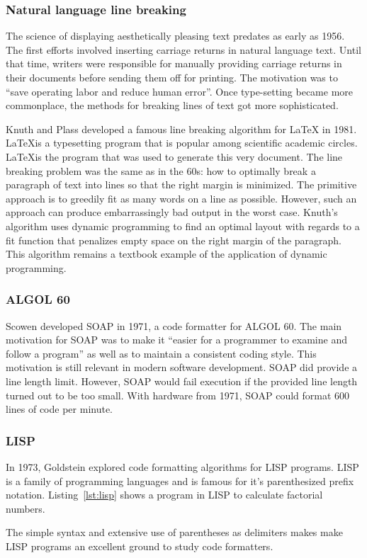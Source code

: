 \subsubsection{Natural language line breaking}
The science of displaying aesthetically pleasing text predates as early as 1956\autocite{harris_keyboard_1956}.
The first efforts involved inserting carriage returns in natural language text.
Until that time, writers were responsible for manually providing carriage returns in their documents before sending them off for printing.
The motivation was to ``save operating labor and reduce human error''.
Once type-setting became more commonplace, the methods for breaking lines of text got more sophisticated.

Knuth and Plass developed a famous line breaking algorithm\autocite{knuth_breaking_1981} for \LaTeX{} in 1981.
\LaTeX is a typesetting program that is popular among scientific academic circles.
\LaTeX is the program that was used to generate this very document.
The line breaking problem was the same as in the 60s: how to optimally break a paragraph of text into lines so that the right margin is minimized.
The primitive approach is to greedily fit as many words on a line as possible.
However, such an approach can produce embarrassingly bad output in the worst case.
Knuth's algorithm uses dynamic programming to find an optimal layout with regards to a fit function that penalizes empty space on the right margin of the paragraph.
This algorithm remains a textbook example of the application of dynamic programming\autocite{dreyfus2002richard}.

\subsubsection{ALGOL 60}
Scowen\autocite{scowen_soapprogram_1971} developed SOAP in 1971, a code formatter for ALGOL 60.
The main motivation for SOAP was to make it ``easier for a programmer to examine and follow a program'' as well as to maintain a consistent coding style.
This motivation is still relevant in modern software development.
SOAP did provide a line length limit.
However, SOAP would fail execution if the provided line length turned out to be too small.
With hardware from 1971, SOAP could format 600 lines of code per minute.

\subsubsection{LISP}
In 1973, Goldstein\autocite{goldstein_pretty-printing_1973} explored code formatting algorithms for LISP\autocite{mccarthy_recursive_1960} programs.
LISP is a family of programming languages and is famous for it's parenthesized prefix notation.
Listing~\ref{lst:lisp} shows a program in LISP to calculate factorial numbers.

The simple syntax and extensive use of parentheses as delimiters makes make LISP programs an excellent ground to study code formatters.

